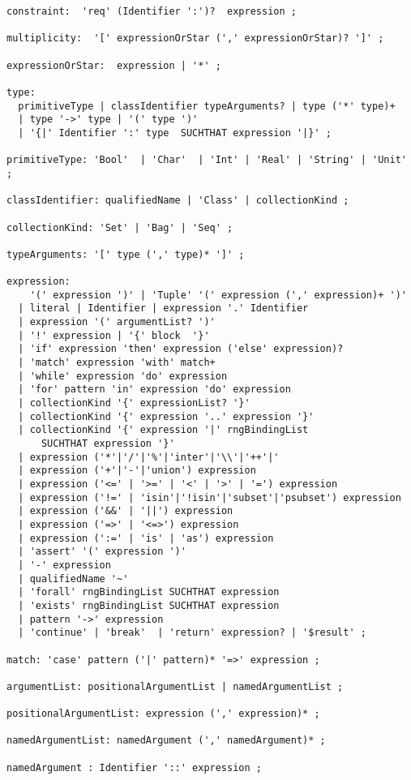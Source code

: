 {\begin{verbatim}
constraint:  'req' (Identifier ':')?  expression ;

multiplicity:  '[' expressionOrStar (',' expressionOrStar)? ']' ;

expressionOrStar:  expression | '*' ;

type:
  primitiveType | classIdentifier typeArguments? | type ('*' type)+       
  | type '->' type | '(' type ')' 
  | '{|' Identifier ':' type  SUCHTHAT expression '|}' ;

primitiveType: 'Bool'  | 'Char'  | 'Int' | 'Real' | 'String' | 'Unit' ;

classIdentifier: qualifiedName | 'Class' | collectionKind ;

collectionKind: 'Set' | 'Bag' | 'Seq' ;

typeArguments: '[' type (',' type)* ']' ;

expression: 
    '(' expression ')' | 'Tuple' '(' expression (',' expression)+ ')' 
  | literal | Identifier | expression '.' Identifier 
  | expression '(' argumentList? ')' 
  | '!' expression | '{' block  '}' 
  | 'if' expression 'then' expression ('else' expression)? 
  | 'match' expression 'with' match+  
  | 'while' expression 'do' expression  
  | 'for' pattern 'in' expression 'do' expression 
  | collectionKind '{' expressionList? '}' 
  | collectionKind '{' expression '..' expression '}' 
  | collectionKind '{' expression '|' rngBindingList 
      SUCHTHAT expression '}' 
  | expression ('*'|'/'|'%'|'inter'|'\\'|'++'|'
  | expression ('+'|'-'|'union') expression 
  | expression ('<=' | '>=' | '<' | '>' | '=') expression
  | expression ('!=' | 'isin'|'!isin'|'subset'|'psubset') expression 
  | expression ('&&' | '||') expression 
  | expression ('=>' | '<=>') expression 
  | expression (':=' | 'is' | 'as') expression 
  | 'assert' '(' expression ')' 
  | '-' expression 
  | qualifiedName '~' 
  | 'forall' rngBindingList SUCHTHAT expression 
  | 'exists' rngBindingList SUCHTHAT expression 
  | pattern '->' expression 
  | 'continue' | 'break'  | 'return' expression? | '$result' ;

match: 'case' pattern ('|' pattern)* '=>' expression ;

argumentList: positionalArgumentList | namedArgumentList ;

positionalArgumentList: expression (',' expression)* ;

namedArgumentList: namedArgument (',' namedArgument)* ;

namedArgument : Identifier '::' expression ;


\end{verbatim}}
